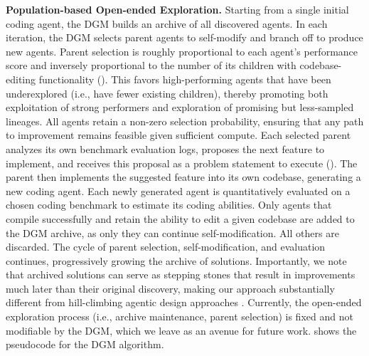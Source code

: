 \textbf{Population-based Open-ended Exploration.}
Starting from a single initial coding agent, the DGM builds an archive of all discovered agents. In each iteration, the DGM selects parent agents to self-modify and branch off to produce new agents. Parent selection is roughly proportional to each agent's performance score and inversely proportional to the number of its children with codebase-editing functionality (). This favors high-performing agents that have been underexplored (i.e., have fewer existing children), thereby promoting both exploitation of strong performers and exploration of promising but less-sampled lineages. All agents retain a non-zero selection probability, ensuring that any path to improvement remains feasible given sufficient compute.
Each selected parent analyzes its own benchmark evaluation logs, proposes the next feature to implement, and receives this proposal as a problem statement to execute (). The parent then implements the suggested feature into its own codebase, generating a new coding agent. Each newly generated agent is quantitatively evaluated on a chosen coding benchmark to estimate its coding abilities. Only agents that compile successfully and retain the ability to edit a given codebase are added to the DGM archive, as only they can continue self-modification. All others are discarded. The cycle of parent selection, self-modification, and evaluation continues, progressively growing the archive of solutions. Importantly, we note that archived solutions can serve as stepping stones that result in improvements much later than their original discovery, making our approach substantially different from hill-climbing agentic design approaches \citep{robeyns2025self}. Currently, the open-ended exploration process (i.e., archive maintenance, parent selection) is fixed and not modifiable by the DGM, which we leave as an avenue for future work.  shows the pseudocode for the DGM algorithm.
